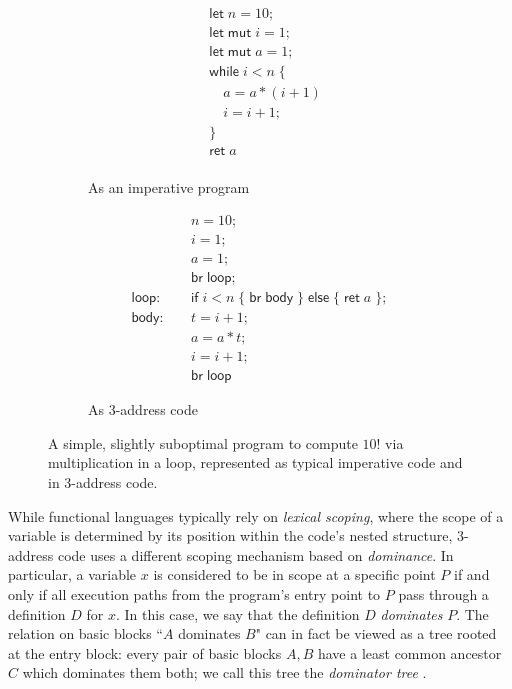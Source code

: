 \documentclass[acmsmall,screen,review]{acmart}
\newcommand{\ms}[1]{\ensuremath{\mathsf{#1}}}
\begin{document}
\begin{figure}
  \begin{subfigure}[t]{.5\textwidth}
    \begin{align*}
      & \ms{let}\;n = 10; \\
      & \ms{let\;mut}\;i = 1; \\
      & \ms{let\;mut}\;a = 1; \\
      & \ms{while}\;i < n\;\{ \\
      & \quad a = a * (i + 1) \\
      & \quad i = i + 1; \\
      & \} \\
      & \ms{ret}\;a \\
    \end{align*}
    \caption{As an imperative program}
    \label{fig:fact-imp}
  \end{subfigure}%
  \begin{subfigure}[t]{.5\textwidth}
    \begin{align*}
                        & n = 10; \\
                        & i = 1; \\
                        & a = 1; \\
                        & \ms{br}\;\ms{loop}; \\
      \ms{loop}: \quad  & \ms{if}\;i < n\;
                          \{\;\ms{br}\;\ms{body}\;\}\;
                          \ms{else}\;\{\;\ms{ret}\;a\;\}; \\
      \ms{body}: \quad  & t = i + 1; \\
                        & a = a * t; \\
                        & i = i + 1; \\
                        & \ms{br}\;\ms{loop}
    \end{align*}
    \caption{As 3-address code}
    \label{fig:fact-3addr}
  \end{subfigure}
  \caption{
    A simple, slightly suboptimal program to compute $10!$ via multiplication in a loop, represented
    as typical imperative code and in 3-address code.
  }
  \Description{}
  \label{fig:fact-program}
\end{figure}

While functional languages typically rely on \emph{lexical scoping}, where the scope of a variable
is determined by its position within the code's nested structure, 3-address code uses a different
scoping mechanism based on \emph{dominance}. In particular, a variable $x$ is considered to be in
scope at a specific point $P$ if and only if all execution paths from the program's entry point to
$P$ pass through a definition $D$ for $x$. In this case, we say that the definition $D$
\emph{dominates} $P$. The relation on basic blocks ``$A$ dominates $B$" can in fact be viewed as a
tree rooted at the entry block: every pair of basic blocks $A, B$ have a least common ancestor $C$
which dominates them both; we call this tree the \emph{dominator tree} \cite{cytron-ssa-intro-91}.
\end{document}
